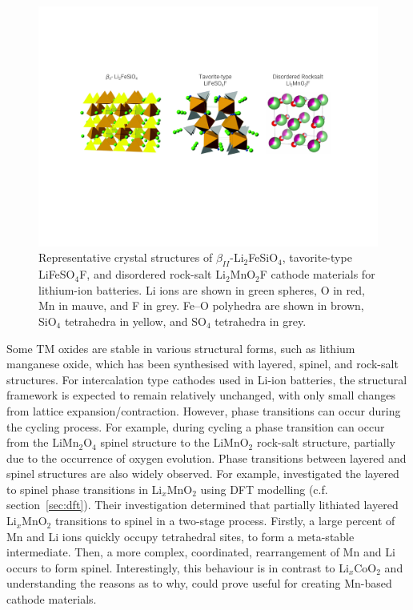 \documentclass[../main.tex]{subfiles}
\begin{document}
\begin{figure}
    \centering
    \includegraphics[scale=0.7]{figures/cathode_structures_others.pdf}
    \caption{Representative crystal structures of $\beta_{II}$-Li$_2$FeSiO$_4$, tavorite-type LiFeSO$_4$F, and disordered rock-salt Li$_2$MnO$_2$F cathode materials for lithium-ion batteries. Li ions are shown in green spheres, O in red, Mn in mauve, and F in grey. Fe–O polyhedra are shown in brown, SiO$_4$ tetrahedra in yellow, and SO$_4$ tetrahedra in grey.}
    \label{fig:cathode_structures}
\end{figure}

Some TM oxides are stable in various structural forms, such as lithium manganese oxide, which has been synthesised with layered, \cite{armstrong1996synthesis} spinel, \cite{mosbah1983phases} and rock-salt structures. \cite{dittrich1969kristallstruktur} For intercalation type cathodes used in Li-ion batteries, the structural framework is expected to remain relatively unchanged, with only small changes from lattice expansion/contraction. However, phase transitions can occur during the cycling process. For example, during cycling a phase transition can occur from the LiMn$_2$O$_4$ spinel structure to the LiMnO$_2$ rock-salt structure, partially due to the occurrence of oxygen evolution. \cite{peng2017atomistic} Phase transitions between layered and spinel structures are also widely observed. \cite{chen2018understanding} For example, \citeauthor{reed2001layered} investigated the layered to spinel phase transitions in Li$_x$MnO$_2$ using DFT modelling (c.f. section~\ref{sec:dft}). \cite{reed2001layered} Their investigation determined that partially lithiated layered Li$_x$MnO$_2$ transitions to spinel in a two-stage process. Firstly, a large percent of Mn and Li ions quickly occupy tetrahedral sites, to form a meta-stable intermediate. Then, a more complex, coordinated, rearrangement of Mn and Li occurs to form spinel. Interestingly, this behaviour is in contrast to Li$_x$CoO$_2$ and understanding the reasons as to why, could prove useful for creating Mn-based cathode materials.
\end{document}
